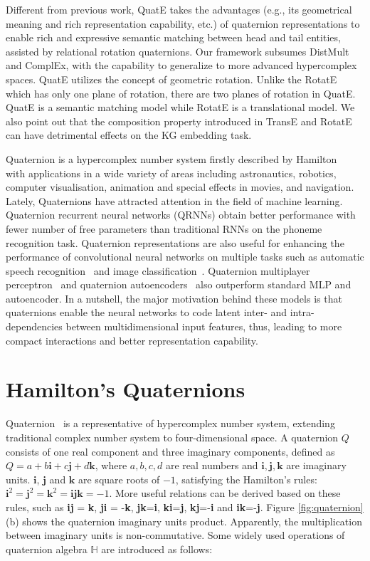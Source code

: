 \documentclass{article}
\begin{document}
Different from previous work, QuatE takes the advantages (e.g., its geometrical meaning and rich representation capability, etc.) of quaternion representations to enable rich and expressive semantic matching between head and tail entities, assisted by relational rotation quaternions.  Our framework subsumes DistMult and ComplEx, with the capability to generalize to more advanced hypercomplex spaces. QuatE utilizes the concept of geometric rotation. Unlike the RotatE which has only one plane of rotation, there are two planes of rotation in QuatE. QuatE is a semantic matching model while RotatE is a translational model. We also point out that the composition property introduced in TransE and RotatE can have detrimental effects on the KG embedding task.

Quaternion is a hypercomplex number system firstly described by Hamilton~\citep{hamilton1844lxxviii} with applications in a wide variety of areas including astronautics, robotics, computer visualisation, animation and special effects in movies, and navigation. Lately, Quaternions have attracted attention in the field of machine learning. Quaternion recurrent neural networks (QRNNs) obtain better performance with fewer number of free parameters than traditional RNNs on the phoneme recognition task. Quaternion representations are also useful for enhancing the performance of convolutional neural networks on multiple tasks such as automatic speech recognition~\citep{parcollet2018quaternion2} and image classification~\citep{gaudet2018deep,DBLP:journals/corr/abs-1811-02656}. Quaternion multiplayer perceptron~\citep{7846290} and quaternion autoencoders~\citep{Parcollet2017QuaternionDE} also outperform standard MLP and autoencoder. In a nutshell, the major motivation behind these models is that quaternions enable the neural networks to code latent inter- and intra-dependencies between multidimensional input features, thus, leading to more compact interactions and better representation capability.

\section{Hamilton's Quaternions}
Quaternion~\citep{hamilton1844lxxviii} is a representative of hypercomplex number system, extending traditional complex number system to four-dimensional space. A quaternion $Q$ consists of one real component and three imaginary components, defined as $ Q = a + b\textbf{i} + c\textbf{j}  + d\textbf{k}$, where $a, b, c , d $ are real numbers and $\textbf{i}, \textbf{j}, \textbf{k}$ are imaginary units. $\textbf{i}$, $\textbf{j}$ and $\textbf{k}$ are square roots of $-1$, satisfying the Hamilton's rules: $ \textbf{i}^2 = \textbf{j}^2 = \textbf{k}^2 = \textbf{i}\textbf{j}\textbf{k} = -1$. More useful relations can be derived based on these rules, such as \textbf{i}\textbf{j} = \textbf{k}, \textbf{j}\textbf{i} = -\textbf{k}, \textbf{j}\textbf{k}=\textbf{i}, \textbf{k}\textbf{i}=\textbf{j}, \textbf{k}\textbf{j}=-\textbf{i} and \textbf{i}\textbf{k}=-\textbf{j}. Figure \ref{fig:quaternion}(b) shows the quaternion imaginary units product. Apparently, the multiplication between imaginary units is non-commutative. Some widely used operations of quaternion algebra $\mathbb{H}$ are introduced as follows:
\end{document}
